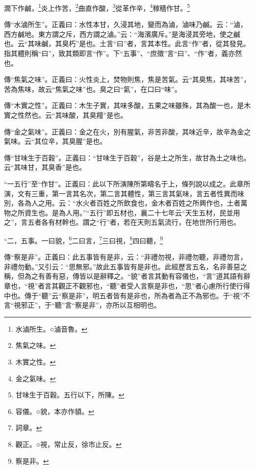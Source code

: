 潤下作鹹，\footnote{水滷所生。○滷音魯。}炎上作苦，\footnote{焦氣之味。}曲直作酸，\footnote{木實之性。}從革作辛，\footnote{金之氣味。}稼穡作甘。\footnote{甘味生于百穀。五行以下，所陳。}

{\noindent\zhuan{}\fzbyks 傳“水滷所生”。正義曰：水性本甘，久浸其地，變而為滷，滷味乃鹹。云：“滷，西方鹹地。東方謂之斥，西方謂之滷。”云：“海濱廣斥。”是海浸其旁地，使之鹹也。云“其味鹹，其臭朽”是也。土言“曰”者，言其本性。此言“作”者，從其發見。指其體則稱“曰”，致其類即言“作”。下“五事”、“庶徵”言“曰”、“作”者，義亦然也。 \par}

{\noindent\zhuan{}\fzbyks 傳“焦氣之味”。正義曰：火性炎上，焚物則焦，焦是苦氣。云“其臭焦，其味苦”，苦為焦味，故云“焦氣之味”也。臭之曰“氣”，在口曰“味”。 \par}

{\noindent\zhuan{}\fzbyks 傳“木實之性”。正義曰：木生子實，其味多酸，五果之味雖殊，其為酸一也，是木實之性然也。云“其味酸，其臭羶”是也。 \par}

{\noindent\zhuan{}\fzbyks 傳“金之氣味”。正義曰：金之在火，別有腥氣，非苦非酸，其味近辛，故辛為金之氣味。云“其位辛，其臭腥”是也。 \par}

{\noindent\zhuan{}\fzbyks 傳“甘味生于百穀”。正義曰：“甘味生于百穀”，谷是土之所生，故甘為土之味也。云“其味甘，其臭香”是也。 \par}

{\noindent\shu{}\fzkt “一五行”至“作甘”。正義曰：此以下所演陳所第疇名于上，條列說以成之。此章所演，文有三重，第一言其名次，第二言其體性，第三言其氣味，言五者性異而味別，各為人之用。云：“水火者百姓之所飲食也，金木者百姓之所興作也，土者萬物之所資生也。是為人用。”“五行”即五材也，襄二十七年云“天生五材，民並用之”，言五者各有材幹也。謂之“行”者，若在天則五氣流行，在地世所行用也。 \par}

“二，五事。一曰貌，\footnote{容儀。○貌，本亦作{\hanaa 䫉}。}二曰言，\footnote{詞章。}三曰視，\footnote{觀正。○視，常止反，徐市止反。}四曰聽，\footnote{察是非。}


{\noindent\zhuan{}\fzbyks 傳“察是非”。正義曰：此五事皆有是非，云：“非禮勿視，非禮勿聽，非禮勿言，非禮勿動。”又引云：“思無邪。”故此五事皆有是非也。此經歷言五名，名非善惡之稱，但為之有善有惡，傳皆以是辭釋之。“貌”者言其動有容儀也，“言”道其語有辭章也，“視”者言其觀正不觀邪也，“聽”者受人言察是非也，“思”者心慮所行使行得中也。傳于“聽”云“察是非”，明五者皆有是非也，所為者為正不為邪也。于“視”不言“視邪正”，于“聽”言“察是非”，亦所以互相明也。 \par}

